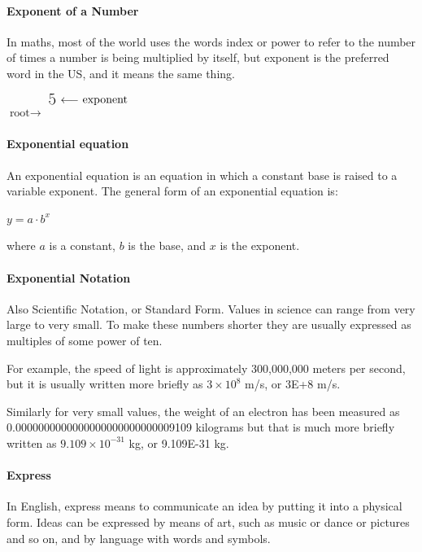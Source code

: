 \documentclass[12pt]{article}
\begin{document}
\paragraph{Exponent of a Number}
In maths, most of the world uses the words index or power to refer to the number of times a number is being multiplied by itself, but exponent is the preferred word in the US, and it means the same thing.\\

\begin{center}
$\text{root}\rightarrow$
{\fontsize{30}{34}}
$\raisebox{1.6ex}{\textsuperscript{{\fontsize{15}{20}\selectfont 5}}} \ \raisebox{2.7ex}{$\longleftarrow$\ }\raisebox{1.9ex}{\textsuperscript{\normalsize{\text{exponent}}}}$
\normalsize
\end{center}

\paragraph{Exponential equation}
An exponential equation is an equation in which a constant base is raised to a variable exponent. The general form of an exponential equation is:
\begin{center}
{\Large $y = a \cdot b^x$}
\end{center}
where \(a\) is a constant, \(b\) is the base, and \(x\) is the exponent.

\paragraph{Exponential Notation}
Also Scientific Notation, or Standard Form. Values in science can range from very large to very small. To make these numbers shorter they are usually expressed as multiples of some power of ten.

For example, the speed of light is approximately 300,000,000 meters per second, but it is usually written more briefly as $3\times10^8$ m/s, or 3E+8 m/s.

Similarly for very small values, the weight of an electron has been measured as\\0.0000000000000000000000000009109 kilograms but that is much more briefly written as $9.109\times10^{-31}$ kg, or 9.109E-31 kg.

\paragraph{Express}
In English, express means to communicate an idea by putting it into a physical form. Ideas can be expressed by means of art, such as music or dance or pictures and so on, and by language with words and symbols.
\end{document}
